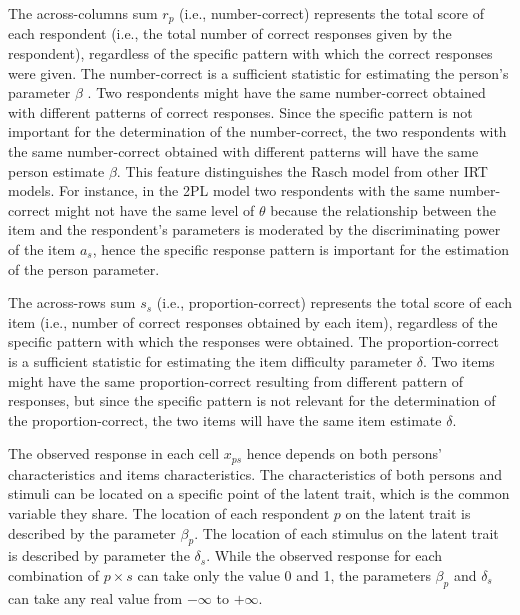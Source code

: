 \documentclass[12pt]{book}
\begin{document}
The across-columns sum $r_p$ (i.e., number-correct) represents the total score of each respondent (i.e., the total number of correct responses given by the respondent), regardless of the specific pattern with which the correct responses were given.
The number-correct is a sufficient statistic for estimating the person's parameter $\beta$ \cite{wright1979, wright1997}. 
Two respondents might have the same number-correct obtained with different patterns of correct responses. Since the specific pattern is not important for the determination of the number-correct, the two respondents with the same number-correct obtained with different patterns will have the same person estimate $\beta$. 
This feature distinguishes the Rasch model from other IRT models. For instance, in the 2PL model two respondents with the same number-correct might not have the same level of $\theta$ because the relationship between the item and the respondent's parameters is moderated by the discriminating power of the item $a_s$, hence the specific response pattern is important for the estimation of the person parameter.

The across-rows sum $s_s$ (i.e., proportion-correct) represents the total score of each item (i.e., number of correct responses obtained by each item), regardless of the specific pattern with which the responses were obtained.  The proportion-correct is a sufficient statistic for estimating the item difficulty parameter $\delta$.
Two items might have the same proportion-correct resulting from different pattern of responses, but since the specific pattern is not relevant for the determination of the proportion-correct, the two items will have the same item estimate $\delta$.

The observed response in each cell $x_{ps}$ hence depends on both persons’ characteristics and items characteristics. 
The characteristics of both persons and stimuli can be located on a specific point of the latent trait, which is the common variable they share. 
The location
of each respondent $p$ on the latent trait is described by the parameter $\beta_p$. The location of each stimulus on the latent trait is described by parameter the $\delta_s$. 
While the observed response for each combination of $p \times s$ can take only the value 0 and 1, the parameters $\beta_p$ and $\delta_s$ can take any real value from $- \infty$ to $+ \infty$. 
\end{document}
